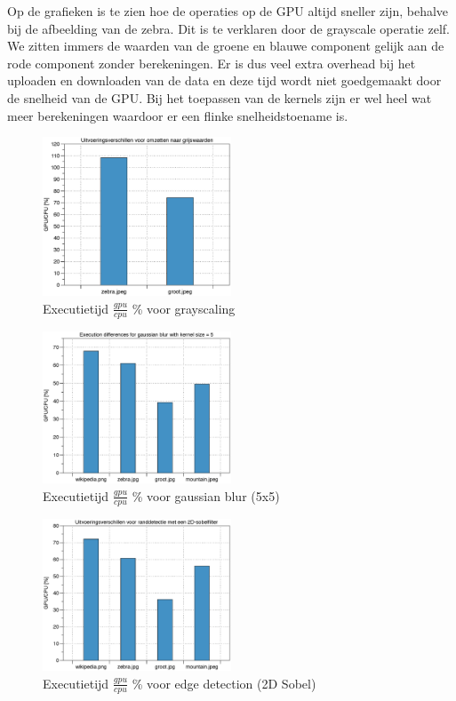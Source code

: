 \documentclass[10pt, twocolumn, a4paper]{article}
\begin{document}
Op de grafieken is te zien hoe de operaties op de GPU altijd sneller zijn, behalve bij de afbeelding van de zebra. Dit is te verklaren door de grayscale operatie zelf. We zitten immers de waarden van de groene en blauwe component gelijk aan de rode component zonder berekeningen. Er is dus veel extra overhead bij het uploaden en downloaden van de data en deze tijd wordt niet goedgemaakt door de snelheid van de GPU. Bij het toepassen van de kernels zijn er wel heel wat meer berekeningen waardoor er een flinke snelheidstoename is.

\begin{figure}[H]
    \centering
    \includegraphics[width=0.5\textwidth]{grayscaling.eps}
    \caption{Executietijd $\frac{gpu}{cpu}$ \% voor grayscaling}
    \label{blocksize}
\end{figure}

\begin{figure}[H]
    \centering
    \includegraphics[width=0.5\textwidth]{gaussian_blur.eps}
    \caption{Executietijd $\frac{gpu}{cpu}$ \% voor gaussian blur (5x5)}
    \label{blocksize}
\end{figure}

\begin{figure}[H]
    \centering
    \includegraphics[width=0.5\textwidth]{edge_detection.eps}
    \caption{Executietijd $\frac{gpu}{cpu}$ \% voor edge detection (2D Sobel)}
    \label{blocksize}
\end{figure}
\end{document}
